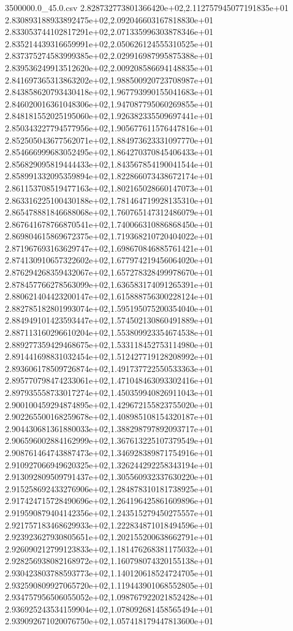 \begin{filecontents*}{3500000.0_45.0.csv}
2.828732773801366420e+02,2.112757945077191835e+01
2.830893188933892475e+02,2.092046603167818830e+01
2.833053744102817291e+02,2.071335996303878346e+01
2.835214439316659991e+02,2.050626124555310525e+01
2.837375274583999385e+02,2.029916987995875388e+01
2.839536249913512620e+02,2.009208586694148835e+01
2.841697365313863202e+02,1.988500920723708987e+01
2.843858620793430418e+02,1.967793990155041683e+01
2.846020016361048306e+02,1.947087795060269855e+01
2.848181552025195060e+02,1.926382335509697441e+01
2.850343227794577956e+02,1.905677611576447816e+01
2.852505043677562071e+02,1.884973623331097770e+01
2.854666999683052495e+02,1.864270370845406433e+01
2.856829095819444433e+02,1.843567854190041544e+01
2.858991332095359894e+02,1.822866073438672174e+01
2.861153708519477163e+02,1.802165028660147073e+01
2.863316225100430188e+02,1.781464719928135310e+01
2.865478881846688068e+02,1.760765147312486079e+01
2.867641678766870541e+02,1.740066310886868450e+01
2.869804615869672375e+02,1.719368210720404022e+01
2.871967693163629747e+02,1.698670846885761421e+01
2.874130910657322602e+02,1.677974219456064020e+01
2.876294268359432067e+02,1.657278328499978670e+01
2.878457766278563099e+02,1.636583174091265391e+01
2.880621404423200147e+02,1.615888756300228124e+01
2.882785182801993074e+02,1.595195075200354040e+01
2.884949101423593447e+02,1.574502130860491889e+01
2.887113160296610204e+02,1.553809923354674538e+01
2.889277359429468675e+02,1.533118452753114980e+01
2.891441698831032454e+02,1.512427719128208992e+01
2.893606178509726874e+02,1.491737722550533363e+01
2.895770798474233061e+02,1.471048463093302416e+01
2.897935558733017274e+02,1.450359940826911043e+01
2.900100459294874895e+02,1.429672155823755020e+01
2.902265500168259678e+02,1.408985108154320187e+01
2.904430681361880033e+02,1.388298797892093717e+01
2.906596002884162999e+02,1.367613225107379549e+01
2.908761464743887473e+02,1.346928389871754916e+01
2.910927066949620325e+02,1.326244292258343194e+01
2.913092809509791437e+02,1.305560932337630220e+01
2.915258692433276906e+02,1.284878310181738925e+01
2.917424715728490696e+02,1.264196425861609896e+01
2.919590879404142356e+02,1.243515279450275557e+01
2.921757183468629933e+02,1.222834871018494596e+01
2.923923627930805651e+02,1.202155200638662791e+01
2.926090212799123833e+02,1.181476268381175032e+01
2.928256938082168972e+02,1.160798074320155138e+01
2.930423803788593773e+02,1.140120618524724705e+01
2.932590809927065720e+02,1.119443901068552805e+01
2.934757956506055052e+02,1.098767922021852428e+01
2.936925243534159904e+02,1.078092681458565494e+01
2.939092671020076750e+02,1.057418179447813600e+01

\end{filecontents*}

